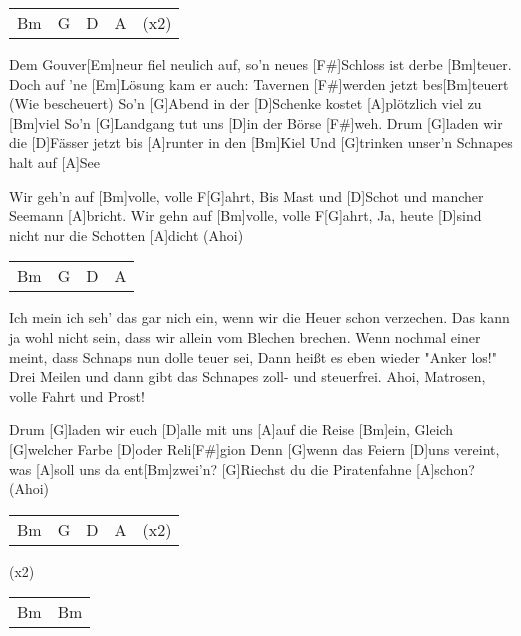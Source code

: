

\begin{guitar}
	 {\footnotesize\begin{tabular}{l|l|l|l l}
			Bm & G & D & A & (x2)
	\end{tabular}}
	
	Dem Gouver[Em]neur fiel neulich auf, so'n neues [F#]Schloss ist derbe [Bm]teuer.
	Doch auf 'ne [Em]Lösung kam er auch: Tavernen [F#]werden jetzt bes[Bm]teuert (Wie bescheuert)
	So'n [G]Abend in der [D]Schenke kostet [A]plötzlich viel zu [Bm]viel
	So'n [G]Landgang tut uns [D]in der Börse [F#]weh.
	Drum [G]laden wir die [D]Fässer jetzt bis [A]runter in den [Bm]Kiel
	Und [G]trinken unser'n Schnapes halt auf [A]See
	
	Wir geh'n auf [Bm]volle, volle F[G]ahrt, 
	Bis Mast und [D]Schot und mancher Seemann [A]bricht.
	Wir gehn auf [Bm]volle, volle F[G]ahrt,
	Ja, heute [D]sind nicht nur die Schotten [A]dicht (Ahoi)
	
	 {\footnotesize\begin{tabular}{l|l|l|l}
			Bm & G & D & A 
	\end{tabular}}
	
	Ich mein ich seh' das gar nich ein, wenn wir die Heuer schon verzechen.
	Das kann ja wohl nicht sein, dass wir allein vom Blechen brechen.
	Wenn nochmal einer meint, dass Schnaps nun dolle teuer sei,
	Dann heißt es eben wieder "Anker los!"
	Drei Meilen und dann gibt das Schnapes zoll- und steuerfrei.
	Ahoi, Matrosen, volle Fahrt und Prost!
	
	 
	
	Drum [G]laden wir euch [D]alle mit uns [A]auf die Reise [Bm]ein, 
	Gleich [G]welcher Farbe [D]oder Reli[F#]gion
	Denn [G]wenn das Feiern [D]uns vereint, was [A]soll uns da ent[Bm]zwei'n?
	[G]Riechst du die Piratenfahne [A]schon? (Ahoi)
	
	 {\footnotesize\begin{tabular}{l|l|l|l l}
			Bm & G & D & A & (x2)
	\end{tabular}}

	  (x2)
	
	{\footnotesize\begin{tabular}{l|l}
			Bm & Bm
	\end{tabular}}
\end{guitar}